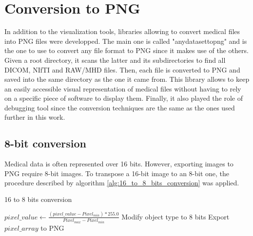 \section{Conversion to PNG}
\setlength{\marginparwidth}{3cm}\leavevmode {}In addition to the visualization tools, libraries allowing to convert medical files into PNG files were developped. The main one is called "anydatasettopng" and is the one to use to convert any file format to PNG since it makes use of the others. Given a root directory, it scans the latter and its subdirectories to find all DICOM, NIfTI and RAW/MHD files. Then, each file is converted to PNG and saved into the same directory as the one it came from. This library allows to keep an easily accessible visual representation of medical files without having to rely on a specific piece of software to display them. Finally, it also played the role of debugging tool since the conversion techniques are the same as the ones used further in this work. 


\subsection{8-bit conversion}
\setlength{\marginparwidth}{3cm}\leavevmode {}Medical data is often represented over 16 bits. However, exporting images to PNG require 8-bit images. To transpose a 16-bit image to an 8-bit one, the procedure described by algorithm \ref{alg:16_to_8_bits_conversion} was applied. 

\begin{algorithm}
    \caption{16 to 8 bits conversion}
    \label{alg:16_to_8_bits_conversion}
    \begin{algorithmic}[1] %
        			\State $pixel\_value \gets \frac{(pixel\_value - Pixel_{min}) * 255.0}{Pixel_{max} - Pixel_{min}}$
        		\EndFor
        		\State Modify object type to 8 bits
        		\State Export $pixel\_array$ to PNG
        \EndProcedure
    \end{algorithmic}
\end{algorithm}
